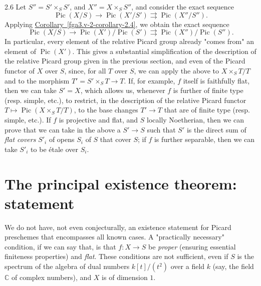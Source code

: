 \begin{remark}{2.6}
    Let \(S''=S'\times _S S'\), and \(X''=X\times _S S''\), and consider the exact sequence
    \[       \operatorname {Pic}(X/S)       \to  \operatorname {Pic}(X'/S')       \rightrightarrows  \operatorname {Pic}(X''/S'').     \]
    Applying \hyperref[fga3.v-2-corollary-2.4]{Corollary~\ref*{fga3.v-2-corollary-2.4}}, we obtain the exact sequence
    \[       \operatorname {Pic}(X/S)       \to  \operatorname {Pic}(X')/\operatorname {Pic}(S')       \rightrightarrows  \operatorname {Pic}(X'')/\operatorname {Pic}(S'').     \]
    In particular, every element of the relative Picard group already "comes from" an element of \(\operatorname {Pic}(X')\).
    This gives a substantial simplification of the description of the relative Picard group given in the previous section, and even of the Picard functor of \(X\) over \(S\), since, for all \(T\) over \(S\), we can apply the above to \(X\times _S T/T\) and to the morphism \(T'=S'\times _S T\to  T\).
    If, for example, \(f\) itself is faithfully flat, then we can take \(S'=X\), which allows us, whenever \(f\) is further of finite type (resp. simple, etc.), to restrict, in the description of the relative Picard functor \(T\mapsto \operatorname {Pic}(X\times _S T/T)\), to the base changes \(T'\to  T\) that are of finite type (resp. simple, etc.).
    If \(f\) is projective and flat, and \(S\) locally Noetherian, then we can prove that we can take in the above a \(S'\to  S\) such that \(S'\) is the direct sum of \emph{flat covers} \(S'_i\) of opens \(S_i\) of \(S\) that cover \(S\);
    if \(f\) is further separable, then we can take \(S'_i\) to be étale over \(S_i\).\end{remark}\chapter{The principal existence theorem: statement}\thispagestyle{fancy}\label{fga3.v-3}\par{}We do not have, not even conjecturally, an existence statement for Picard preschemes that encompasses all known cases.
  A "practically necessary" condition, if we can say that, is that \(f\colon  X\to  S\) be \emph{proper} (ensuring essential finiteness properties) and \emph{flat}.
  These conditions are not sufficient, even if \(S\) is the spectrum of the algebra of dual numbers \(k[t]/(t^2)\) over a field \(k\) (say, the field \(\mathbb {C}\) of complex numbers), and \(X\) is of dimension \(1\).
